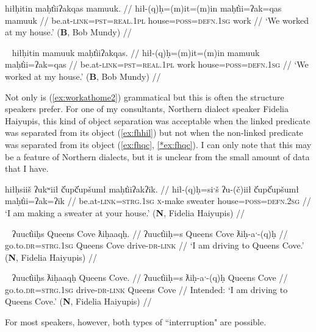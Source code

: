 \ex \label{ex:workathome}
\begingl
\glpreamble hiłḥitin maḥt̓iiʔakqas mamuuk. //
\gla hił-(q)ḥ=(m)it=(m)in maḥt̓ii=ʔak=qas mamuuk //
\glb be.at-\textsc{link}=\textsc{pst}=\textsc{real.1pl} house=\textsc{poss}=\textsc{defn.1sg} work //
\glft `We worked at my house.' (\textbf{B}, Bob Mundy) //
\endgl
\xe

\ex~ \label{ex:workathome2}
\begingl
\glpreamble hiłḥitin mamuuk maḥt̓iiʔakqas. //
\gla hił-(q)ḥ=(m)it=(m)in mamuuk maḥt̓ii=ʔak=qas //
\glb be.at-\textsc{link}=\textsc{pst}=\textsc{real.1pl} work house=\textsc{poss}=\textsc{defn.1sg} //
\glft `We worked at my house.' (\textbf{B}, Bob Mundy) //
\endgl
\xe

Not only is (\ref{ex:workathome2}) grammatical but this is often the structure speakers prefer. For one of my consultants, Northern dialect speaker Fidelia Haiyupis, this kind of object separation was acceptable when the linked predicate was separated from its object (\ref{ex:fhhil}) but not when the non-linked predicate was separated from its object (\ref{ex:fhqc}, \ref{*ex:fhqc}). I can only note that this may be a feature of Northern dialects, but it is unclear from the small amount of data that I have. %

\ex \label{ex:fhhil}
\begingl
\glpreamble hiłḥsiiš ʔukʷiił č̓upč̓upšumł maḥt̓iiʔakʔik. //
\gla hił-(q)ḥ=siˑš ʔu-(č)iił č̓upč̓upšumł maḥt̓ii=ʔak=ʔik //
\glb be.at-\textsc{link}=\textsc{strg.1sg} \textsc{x}-make sweater house=\textsc{poss}=\textsc{defn.2sg} //
\glft `I am making a sweater at your house.' (\textbf{N}, Fidelia Haiyupis) //
\endgl
\xe

\ex~ \label{ex:fhqc}
\begingl
\glpreamble ʔuuct̓iiḥs Queens Cove ƛiḥaaqḥ. //
\gla ʔuuct̓iiḥ=s Queens Cove ƛiḥ-aˑ-(q)ḥ //
\glb go.to.\textsc{dr}=\textsc{strg.1sg} Queens Cove drive-\textsc{dr}-\textsc{link} //
\glft `I am driving to Queens Cove.' (\textbf{N}, Fidelia Haiyupis) //
\endgl
\xe

\ex~ \label{*ex:fhqc}
\begingl
\glpreamble *ʔuuct̓iiḥs ƛiḥaaqḥ Queens Cove. //
\gla ʔuuct̓iiḥ=s ƛiḥ-aˑ-(q)ḥ Queens Cove //
\glb go.to.\textsc{dr}=\textsc{strg.1sg} drive-\textsc{dr}-\textsc{link} Queens Cove //
\glft Intended: `I am driving to Queens Cove.' (\textbf{N}, Fidelia Haiyupis) //
\endgl
\xe

\noindent For most speakers, however, both types of ``interruption" are possible.

